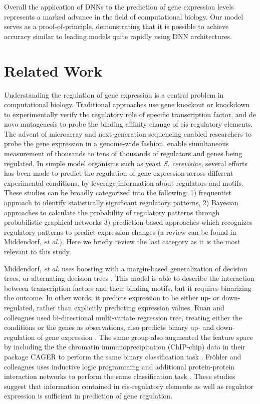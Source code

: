 \documentclass{article}
\begin{document}
Overall the application of DNNs to the prediction of gene expression levels represents a marked advance in the field of computational biology. Our model serves as a proof-of-principle, demonstrating that it is possible to achieve accuracy similar to leading models quite rapidly using DNN architectures.

\section{Related Work}

Understanding the regulation of gene expression is a central problem in computational biology. Traditional approaches use gene knockout or knockdown to experimentally verify the regulatory role of specific transcription factor, and de novo mutagenesis to probe the binding affinity change of cis-regulatory elements. The advent of microarray and next-generation sequencing enabled researchers to probe the gene expression in a genome-wide fashion, enable simultaneous measurement of thousands to tens of thousands of regulators and genes being regulated. In simple model organisms such as yeast \textit{S. cerevisiae}, several efforts has been made to predict the regulation of gene expression across different experimental conditions, by leverage information about regulators and motifs. These studies can be broadly categorized into the following: 1) frequentist approach to identify statistically significant regulatory patterns, 2) Bayesian approaches to calculate the probability of regulatory patterns through probabilistic graphical networks 3) prediction-based approaches which recognizes regulatory patterns to predict expression changes (a review can be found in Middendorf, \textit{et al.}). Here we briefly review the last category as it is the most relevant to this study.

Middendorf, \textit{et al.} uses boosting with a margin-based generalization of decision trees, or alternating decision trees \cite{Middendorf:2004gta}. This model is able to describe the interaction between transcription factors and their binding motifs, but it requires binarizing the outcome. In other words, it predicts expression to be either up- or down-regulated, rather than explicitly predicting expression values. Ruan and colleagues used bi-directional multi-variate regression tree, treating either the conditions or the genes as observations, also predicts binary up- and down-regulation of gene expression \cite{Ruan:2006hl}. The same group also augmented the feature space by including the the chromatin immunoprecipitation (ChIP-chip) data in their package CAGER to perform the same binary classification task \cite{Ruan:2005dd}. Fröhler and colleagues uses inductive logic programming and additional protein-protein interaction networks to perform the same classification task \cite{Frohler:2007fy}. These studies suggest that information contained in cis-regulatory elements as well as regulator expression is sufficient in prediction of gene regulation.
\end{document}
